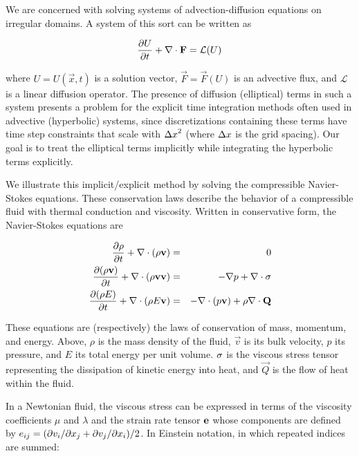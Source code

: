 We are concerned with solving systems of advection-diffusion equations on 
irregular domains. A system of this sort can be written as

\begin{equation}
\frac{\partial U}{\partial t} + \nabla\cdot{\mathbf{F}} = \mathcal{L}(U) \label{eq:advectionDiffusion}
\end{equation}

\noindent
where $U = U(\vec{x}, t)$ is a solution vector, $\vec{F} = \vec{F}(U)$ is an 
advective flux, and $\mathcal{L}$ is a linear diffusion operator. The presence 
of diffusion (elliptical) terms in such a system presents a problem for the
explicit time integration methods often used in advective (hyperbolic) systems, 
since discretizations containing these terms have time step constraints 
that scale with ${\Delta x}^2$ (where ${\Delta x}$ is the grid spacing). Our goal is to 
treat the elliptical terms implicitly while integrating the hyperbolic terms
explicitly.

We illustrate this implicit/explicit method by solving the compressible 
Navier-Stokes equations. These conservation laws describe the behavior of a 
compressible fluid with thermal conduction and viscosity. Written
in conservative form, the Navier-Stokes equations are

\begin{eqnarray}
\frac{\partial \rho}{\partial t} + \nabla\cdot{(\rho \mathbf{v})} &=& 0 \notag \\ 
\frac{\partial (\rho \mathbf{v})}{\partial t} + \nabla\cdot{(\rho \mathbf{v}\mathbf{v})} &=& -\nabla{p} + \nabla\cdot{\mathbf{\sigma}} \label{eq:CNS} \\
\frac{\partial (\rho E)}{\partial t} + \nabla\cdot{(\rho E \mathbf{v})} &=& -\nabla\cdot{(p\mathbf{v})} + \rho\nabla\cdot{\mathbf{Q}} \notag
\end{eqnarray}

\noindent
These equations are (respectively) the laws of conservation of mass, momentum, 
and energy. Above, $\rho$ is the mass density of the fluid, $\vec{v}$ is its 
bulk velocity, $p$ its pressure, and $E$ its total energy per unit volume. 
$\mathbf{\sigma}$ is the viscous stress tensor representing the dissipation of 
kinetic energy into heat, and $\vec{Q}$ is the flow of heat within the fluid. 

In a Newtonian fluid, the viscous stress can be expressed in terms of the 
viscosity coefficients $\mu$ and $\lambda$ and the strain rate tensor 
$\mathbf{e}$ whose components are defined by $e_{ij} = (\partial v_i/\partial x_j + \partial v_j/\partial x_i)/2$. In Einstein 
notation, in which repeated indices are summed:


